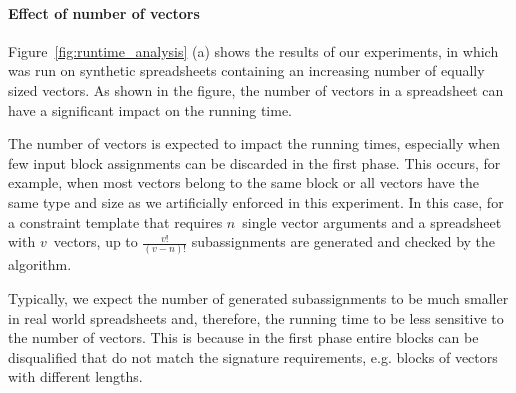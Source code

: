 \paragraph{Effect of number of vectors}
Figure~\ref{fig:runtime_analysis} (a) shows the results of our experiments, in which \sname was run on synthetic spreadsheets containing an increasing number of equally sized vectors.
As shown in the figure, the number of vectors in a spreadsheet can have a significant impact on the running time.

The number of vectors is expected to impact the running times, especially when few input block assignments can be discarded in the first phase.
This occurs, for example, when most vectors belong to the same block or all vectors have the same type and size as we artificially enforced in this experiment.
In this case, for a constraint template that requires $n$~single vector arguments and a spreadsheet with $v$~vectors, up to $\frac{v!}{(v - n)!}$ subassignments are generated and checked by the algorithm.

Typically, we expect the number of generated subassignments to be much smaller in real world spreadsheets and, therefore, the running time to be less sensitive to the number of vectors.
This is because in the first phase entire blocks can be disqualified that do not match the signature requirements, e.g. blocks of vectors with different lengths. %





